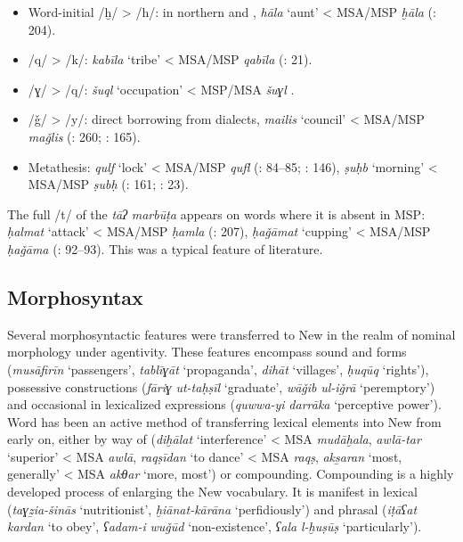 \documentclass[output=paper]{langsci/langscibook}
\begin{document}
\begin{itemize}
\item[]
Word-initial /ḫ/ > /h/: in northern  and , \textit{hāla} ‘aunt’ < MSA/MSP \textit{ḫāla} (\citealt{Īzadpanāh2001}: 204).

\item[]
/q/ > /k/: \textit{kabīla} ‘tribe’ < MSA/MSP \textit{qabīla} (\citealt{NaǧībiFīni2002}: 21).

\item[]
/ɣ/ > /q/: \textit{šuql} ‘occupation’ < MSP/MSA \textit{šuɣl} \citep{Stilo2001}.

\item[]
/ǧ/ > /y/: direct borrowing from   dialects, \textit{mailis} ‘council’ < MSA/MSP \textit{maǧlis} (\citealt{Sarlak2002}: 260; \citealt{Fāẓilī2004}: 165).

\item[]
Metathesis: \textit{qulf} ‘lock’ < MSA/MSP \textit{qufl} (\citealt{Salāmī2004}: 84–85; \citealt{ImāmAhwāzī2000}: 146), \textit{ṣuḥb} ‘morning’ < MSA/MSP \textit{ṣubḥ} (\citealt{Dānišgar1995}: 161; \citealt{NaǧībiFīni2002}: 23).
\end{itemize}

The full /t/ of the \textit{tāʔ} \textit{marbūṭa} appears on words where it is absent in MSP: \textit{ḥalmat} ‘attack’ < MSA/MSP \textit{ḥamla} (\citealt{Īzadpanāh2001}: 207), \textit{ḥaǧāmat} ‘cupping’ < MSA/MSP \textit{ḥaǧāma} (\citealt{Salāmī2004}: 92–93). This was a typical feature of   literature.

\subsection{Morphosyntax}

Several  morphosyntactic features were transferred to New  in the realm of nominal morphology under  agentivity. These features encompass sound and  forms (\textit{musāfirīn} ‘passengers’, \textit{tablīɣāt} ‘propaganda’, \textit{dihāt} ‘villages’, \textit{ḥuqūq} ‘rights’), possessive constructions (\textit{fāriɣ} \textit{ut-taḥṣīl} ‘graduate’, \textit{wāǧib} \textit{ul-iǧrā} ‘peremptory’) and occasional   in lexicalized expressions (\textit{quwwa-yi} \textit{darrāka} ‘perceptive power’). Word  has been an active method of transferring  lexical elements into New  from early on, either by way of  (\textit{diḫālat} ‘interference’ < MSA \textit{mudāḫala}, \textit{awlā-tar} ‘superior’ < MSA \textit{awlā}, \textit{raqṣīdan} ‘to dance’ < MSA \textit{raqṣ}, \textit{aks̱aran} ‘most, generally’ < MSA \textit{akθar} ‘more, most’) or compounding. Compounding is a highly developed process of enlarging the New  vocabulary. It is manifest in lexical  (\textit{taɣẕia-šinās} ‘nutritionist’, \textit{ḫiānat-kārāna} ‘perfidiously’) and phrasal  (\textit{iṭāʕat} \textit{kardan} ‘to obey’, \textit{ʕadam-i} \textit{wuǧūd} ‘non-existence’, \textit{ʕala} \textit{l-ḫuṣūṣ} ‘particularly’).
\end{document}
